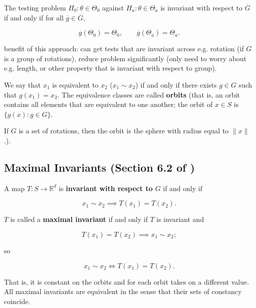 \begin{definition}

The testing problem \(H_0: \theta \in \Theta_0\) against \(H_a: \theta \in \Theta_a\) is invariant with respect to \(\overline{G}\) if and only if for all \(\overline{g} \in \overline{G}\), 

\[
\overline{g}(\Theta_0) = \Theta_0, \qquad \overline{g}(\Theta_a) = \Theta_a.
\]

\end{definition}

benefit of this approach: can get tests that are invariant across e.g. rotation (if \(G\) is a group of rotations), reduce problem significantly (only need to worry about e.g. length, or other property that is invariant with respect to group). 

\begin{definition}

We say that \(x_1\) is equivalent to \(x_2\) (\(x_1 \sim x_2\)) if and only if there exists \(g \in G\) such that \(g(x_1) = x_2\). The equivalence classes are called \textbf{orbits} (that is, an orbit contains all elements that are equivalent to one another; the orbit of \(x \in S\) is \(\{g(x): g \in G \}\).  

\end{definition}

\begin{example}

If \(G\) is a set of rotations, then the orbit is the sphere with radius equal to \(\lVert x \rVert\).).

\end{example}

\subsection{Maximal Invariants (Section 6.2 of \citet{lehmann2005testing})}


\begin{definition}

A map \(T: S \to \mathbb{R}^d\) is \textbf{invariant with respect to \(G\)} if and only if 

\[
x_1 \sim x_2 \implies T(x_1) = T(x_2).
\]

\(T\) is called a \textbf{maximal invariant} if and only if \(T\) is invariant and 

\[
  T(x_1) = T(x_2) \implies x_1 \sim x_2;
\]

so

\[
x_1 \sim x_2 \iff T(x_1) = T(x_2).
\]

That is, it is constant on the orbits and for each orbit takes on a different value. All maximal invariants are equivalent in the sense that their sets of constancy coincide.

\end{definition}

